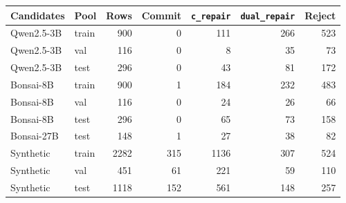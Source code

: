 \begin{tabular}{llrrrrr}
\toprule
Candidates & Pool & Rows & Commit & \texttt{c\_repair} & \texttt{dual\_repair} & Reject \\
\midrule
Qwen2.5-3B & train & 900 & 0 & 111 & 266 & 523 \\
Qwen2.5-3B & val & 116 & 0 & 8 & 35 & 73 \\
Qwen2.5-3B & test & 296 & 0 & 43 & 81 & 172 \\
Bonsai-8B & train & 900 & 1 & 184 & 232 & 483 \\
Bonsai-8B & val & 116 & 0 & 24 & 26 & 66 \\
Bonsai-8B & test & 296 & 0 & 65 & 73 & 158 \\
Bonsai-27B & test & 148 & 1 & 27 & 38 & 82 \\
Synthetic & train & 2282 & 315 & 1136 & 307 & 524 \\
Synthetic & val & 451 & 61 & 221 & 59 & 110 \\
Synthetic & test & 1118 & 152 & 561 & 148 & 257 \\
\bottomrule
\end{tabular}
